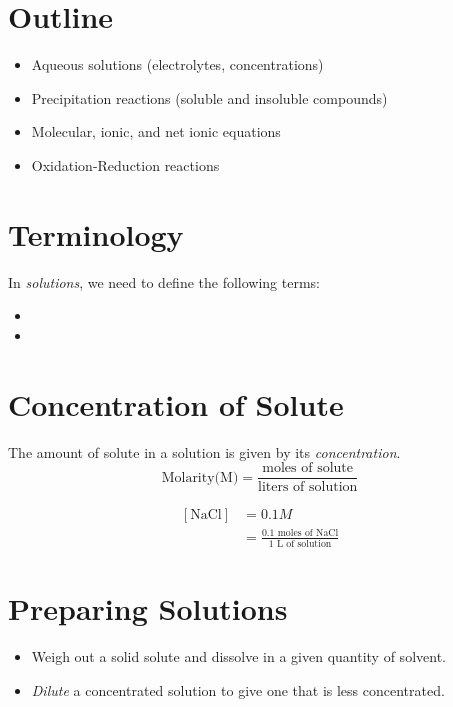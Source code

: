 \documentclass[
	chapter=4
]{chem122notes}
\begin{document}
\section{Outline}\label{sec:outline}
\begin{itemize}
	\item Aqueous solutions (electrolytes, concentrations)
	\item Precipitation reactions (soluble and insoluble compounds)
	\item Molecular, ionic, and net ionic equations
	\item Oxidation-Reduction reactions
\end{itemize}

\section{Terminology}\label{sec:terminology}
In \emph{solutions}, we need to define the following terms:
\begin{itemize}
	\item {}
	\item {}
\end{itemize}

\section{Concentration of Solute}\label{sec:concentration-of-solute}
The amount of solute in a solution is given by its \emph{concentration}.
\begin{equation}
	\mbox{Molarity(M)} = \frac{\mbox{moles of solute}}{\mbox{liters of solution}}
	\label{eq:molarity}
\end{equation}

\begin{equation*}
\begin{aligned}
	[\mbox{NaCl}] &= 0.1 M\\
		      &= \frac{0.1 \mbox{ moles of NaCl}}{1 \mbox{ L of solution}}
\end{aligned}
\end{equation*}

\section{Preparing Solutions}\label{sec:preparing-solutions}
\begin{itemize}
	\item Weigh out a solid solute and dissolve in a given quantity of solvent.
	\item \emph{Dilute} a concentrated solution to give one that is less concentrated.
\end{itemize}
\end{document}
